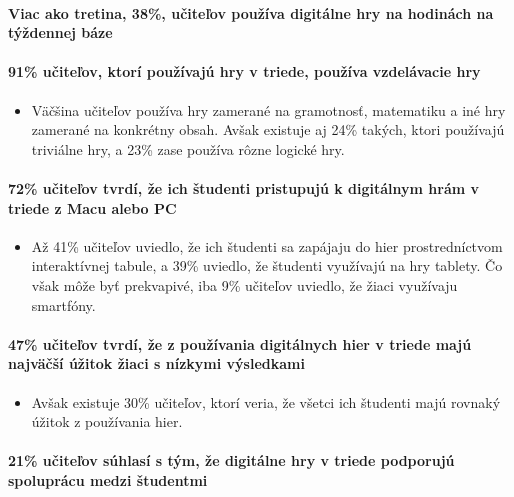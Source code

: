 \documentclass[10pt,twoside,slovak,a4paper]{article}
\begin{document}
\paragraph{Viac ako tretina, 38\%, učiteľov používa digitálne hry na hodinách na týždennej báze\cite{umich}}\label{38}

\paragraph{91\% učiteľov, ktorí používajú hry v triede, používa vzdelávacie hry\cite{academic}}\label{91}
    \begin{itemize}
        \item Väčšina učiteľov používa hry zamerané na gramotnosť, matematiku a iné hry zamerané na konkrétny obsah. Avšak existuje aj 24\% takých, ktori používajú triviálne hry, a 23\% zase používa rôzne logické hry.
    \end{itemize}
    
\paragraph{72\% učiteľov tvrdí, že ich študenti pristupujú k digitálnym hrám v triede z Macu alebo PC\cite{games}}\label{72}
    \begin{itemize}
        \item Až 41\% učiteľov uviedlo, že ich študenti sa zapájaju do hier prostredníctvom interaktívnej tabule, a 39\% uviedlo, že študenti využívajú na hry tablety. Čo však môže byť prekvapivé, iba 9\% učiteľov uviedlo, že žiaci využívaju smartfóny.
    \end{itemize}
    
\paragraph{47\% učiteľov tvrdí, že z používania digitálnych hier v triede majú najväčší úžitok žiaci s nízkymi výsledkami\cite{games}}\label{47}
    \begin{itemize}
        \item Avšak existuje 30\% učiteľov, ktorí veria, že všetci ich študenti majú rovnaký úžitok z používania hier. 
    \end{itemize}
    
\paragraph{21\% učiteľov súhlasí s tým, že digitálne hry v triede podporujú spoluprácu medzi študentmi\cite{games}}\label{21} 
\end{document}
